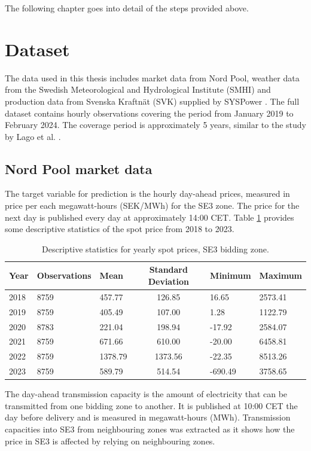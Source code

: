 The following chapter goes into detail of the steps provided above. 

\section{Dataset}
The data used in this thesis includes market data from Nord Pool, weather data from the Swedish Meteorological and Hydrological Institute (SMHI) and production data from Svenska Kraftnät (SVK) supplied by SYSPower \cite{SKM}. The full dataset contains hourly observations covering the period from January 2019 to February 2024. The coverage period is approximately 5 years, similar to the study by Lago et al. \cite{LAGO2021116983}. 

\subsection{Nord Pool market data}
The target variable for prediction is the hourly day-ahead prices, measured in price per each megawatt-hours (SEK/MWh) for the SE3 zone. The price for the next day is published every day at approximately 14:00 CET. Table \ref{tab:spot} provides some descriptive statistics of the spot price from 2018 to 2023. 

\begin{table}[H]
    \centering
    \begin{tabular}{|l|llcll|}
    \hline
    Year  & Observations &  Mean &   Standard Deviation &     Minimum &      Maximum \\
    \hline
    2018 &  8759 &   457.77 &   126.85 &   16.65 &  2573.41 \\ 
    2019 &  8759 &   405.49 &   107.00 &    1.28 &  1122.79 \\
    2020 &  8783 &   221.04 &   198.94 &  -17.92 &  2584.07 \\
    2021 &  8759 &   671.66 &   610.00 &  -20.00 &  6458.81 \\
    2022 &  8759 &  1378.79 &  1373.56 &  -22.35 &  8513.26 \\
    2023 &  8759 &   589.79 &   514.54 & -690.49 &  3758.65 \\
    \hline
    \end{tabular}
    \caption{Descriptive statistics for yearly spot prices, SE3 bidding zone. }
    \label{tab:spot}
\end{table}

The day-ahead transmission capacity is the amount of electricity that can be transmitted from one bidding zone to another. It is published at 10:00 CET the day before delivery and is measured in megawatt-hours (MWh)\cite{NordPool_capacities}. Transmission capacities into SE3 from neighbouring zones was extracted as it shows how the price in SE3 is affected by relying on neighbouring zones.

